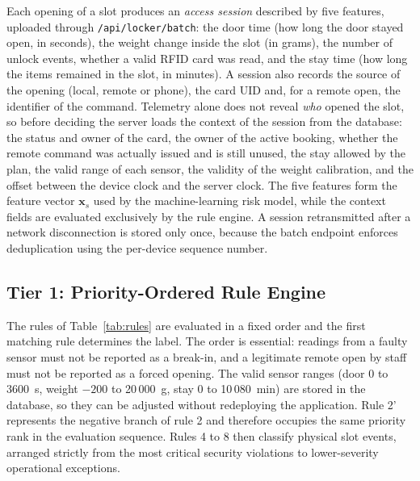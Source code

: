 Each opening of a slot produces an \emph{access session} described by five features, uploaded through
\texttt{/api/locker/batch}: the door time (how long the door stayed open, in seconds), the weight change inside the
slot (in grams), the number of unlock events, whether a valid RFID card was read, and the stay time (how long the items
remained in the slot, in minutes). A session also records the source of the opening (local, remote or phone), the card UID
and, for a remote open, the identifier of the command. Telemetry alone does not reveal \emph{who} opened the slot, so
before deciding the server loads the context of the session from the database: the status and owner of the card, the owner
of the active booking, whether the remote command was actually issued and is still unused, the stay allowed by the plan,
the valid range of each sensor, the validity of the weight calibration, and the offset between the device clock and
the server clock. The five features form the feature vector $\mathbf{x}_s$ used by the machine-learning risk model, while
the context fields are evaluated exclusively by the rule engine. A session retransmitted after a network disconnection is
stored only once, because the batch endpoint enforces deduplication using the per-device sequence number.

\subsection{Tier 1: Priority-Ordered Rule Engine}

The rules of Table~\ref{tab:rules} are evaluated in a fixed order and the first matching rule determines the label.
The order is essential: readings from a faulty sensor must not be reported as a break-in, and a legitimate remote open
by staff must not be reported as a forced opening. The valid sensor ranges (door 0 to 3600~s, weight $-200$ to
20\,000~g, stay 0 to 10\,080~min) are stored in the database, so they can be adjusted without redeploying the
application. Rule 2' represents the negative branch of rule 2 and therefore occupies the same priority rank in the
evaluation sequence. Rules 4 to 8 then classify physical slot events, arranged strictly from the most critical security
violations to lower-severity operational exceptions.

